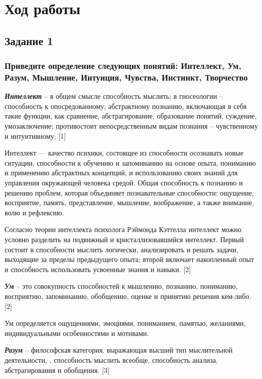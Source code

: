\documentclass[14pt,a4paper,report]{report}
\begin{document}
\clearpage

\section{Ход работы}

\subsection{Задание 1}

\subsubsection{Приведите определение следующих понятий: Интеллект, Ум, Разум, Мышление, Интуиция, Чувства, Инстинкт, Творчество}

\emph{\textbf{Интеллект}} -- в общем смысле способность мыслить; в гносеологии – способность к опосредованному, абстрактному познанию, включающая в себя такие функции, как сравнение, абстрагирование, образование понятий, суждение, умозаключение; противостоит непосредственным видам познания – чувственному и интуитивному; [1]

Интеллект — качество психики, состоящее из способности осознавать новые ситуации, способности к обучению и запоминанию на основе опыта, пониманию и применению абстрактных концепций, и использованию своих знаний для управления окружающей человека средой. Общая способность к познанию и решению проблем, которая объединяет познавательные способности: ощущение, восприятие, память, представление, мышление, воображение, а также внимание, волю и рефлексию. 

Согласно теории интеллекта психолога Рэймонда Кэттелла интеллект можно условно разделить на подвижный и кристаллизовавшийся интеллект. Первый состоит в способности мыслить логически, анализировать и решать задачи, выходящие за пределы предыдущего опыта; второй включает накопленный опыт и способность использовать усвоенные знания и навыки. [2]

\emph{\textbf{Ум}} -- это совокупность способностей к мышлению, познанию, пониманию, восприятию, запоминанию, обобщению, оценке и принятию решения кем-либо. [2]

Ум определяется ощущениями, эмоциями, пониманием, памятью, желаниями, индивидуальными особенностями и мотивами.

\emph{\textbf{Разум}} -- философская категория, выражающая высший тип мыслительной деятельности, , способность мыслить всеобще, способность анализа, абстрагирования и обобщения. [3]
\end{document}
